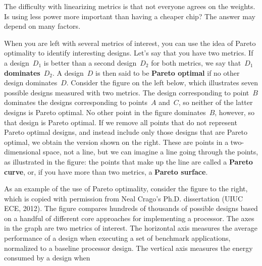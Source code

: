 The difficulty with linearizing metrics is that not everyone agrees
on the weights.  Is using less power more important than having a cheaper
chip?  The answer may depend on many factors.

When you are left with several metrics of interest, you can use the
idea of Pareto optimality to identify interesting designs.
%
Let's say that you have two metrics.  If a design~$D_1$ is better than
a second design~$D_2$ for both metrics, we say that~$D_1$ 
{\bf dominates}~$D_2$.
%
A design~$D$ is then said to be {\bf Pareto optimal} if no other design
dominates~$D$.  Consider the figure on the left below, which illustrates
seven possible designs measured with two metrics.  The design corresponding
to point~$B$ dominates the designs corresponding to points~$A$ and~$C$, so 
neither of the latter designs is Pareto optimal.  No other point 
in the figure dominates~$B$, however, so that design is Pareto optimal.
If we remove all points that do not represent Pareto optimal designs,
and instead include only those designs that are Pareto optimal, we
obtain the version shown on the right.  These are points in a two-dimensional
space, not a line, but we can imagine a line going through the points,
as illustrated in the figure: the points that make up the line are
called a {\bf Pareto curve}, or, if you have more than two metrics,
a {\bf Pareto surface}.\\

\centerline{%
\hspace{1in}%
}\vspace{12pt}

\begin{minipage}{3.25in}
As an example of the use of Pareto optimality, consider the figure
to the right, which is copied with permission from Neal Crago's Ph.D. 
dissertation (UIUC ECE, 2012).  The figure compares hundreds of thousands 
of possible
designs based on a handful of different core approaches for
implementing a processor.  The axes in the graph are two metrics 
of interest.  The horizontal axis measures the average performance of a 
design when
executing a set of benchmark applications, normalized to
a baseline processor design.  The vertical axis measures the energy
consumed by a design when\linebreak
\end{minipage}\hspace{0.25in}%
\begin{minipage}{3in}
\vspace{12pt}
\end{minipage}\mpdone


